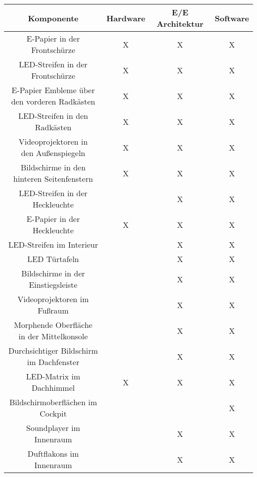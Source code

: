 \begin{table}[hbt]	
	\centering
	\renewcommand{\arraystretch}{1.5}	%
	\label{tab:Entwicklung}
	\begin{tabular}{c|ccc}
		\textbf{Komponente} & \textbf{Hardware} & \textbf{E/E Architektur} & \textbf{Software} \\ 
		\hline 
		\hline 
		\parbox[t]{0.4\linewidth}{\centering E-Papier in der Frontschürze} & X & X & X \\
		\parbox[t]{0.4\linewidth}{\centering LED-Streifen in der Frontschürze} & X & X & X \\
		\parbox[t]{0.4\linewidth}{\centering E-Papier Embleme über\\den vorderen Radkästen} & X & X & X \\
		\parbox[t]{0.4\linewidth}{\centering LED-Streifen in den Radkästen} & X & X & X \\
		\parbox[t]{0.4\linewidth}{\centering Videoprojektoren in\\den Außenspiegeln} & X & X & X \\
		\parbox[t]{0.4\linewidth}{\centering Bildschirme in den\\hinteren Seitenfenstern} & X & X & X \\
		\parbox[t]{0.4\linewidth}{\centering LED-Streifen in der Heckleuchte} &  & X & X \\
		\parbox[t]{0.4\linewidth}{\centering E-Papier in der Heckleuchte} & X & X & X \\
		\parbox[t]{0.4\linewidth}{\centering LED-Streifen im Interieur} &  & X & X \\
		\parbox[t]{0.4\linewidth}{\centering LED Türtafeln} &  & X & X \\
		\parbox[t]{0.4\linewidth}{\centering Bildschirme in der Einstiegsleiste} &  & X & X \\
		\parbox[t]{0.4\linewidth}{\centering Videoprojektoren im Fußraum} &  & X & X \\
		\parbox[t]{0.4\linewidth}{\centering Morphende Oberfläche\\in der Mittelkonsole} &  & X & X \\
		\parbox[t]{0.4\linewidth}{\centering Durchsichtiger Bildschirm\\im Dachfenster} &  & X & X \\
		LED-Matrix im Dachhimmel & X & X & X \\
		\parbox[t]{0.4\linewidth}{\centering Bildschirmoberflächen im Cockpit} &  &  & X \\
		\parbox[t]{0.4\linewidth}{\centering Soundplayer im Innenraum} &  & X & X \\
		\parbox[t]{0.4\linewidth}{\centering Duftflakons im Innenraum} &  & X & X \\
	\end{tabular} 
\end{table}

